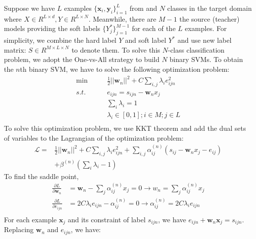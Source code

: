 Suppose we have $L$ examples $\{\textbf{x}_i,\textbf{y}_i\}_{i=1}^L$ from and $N$ classes in the target domain where $X\in R^{L\times d}, Y\in R^{L\times N}$. Meanwhile, there are $M-1$ the source (teacher) models providing the soft labels $\{Y^*_j\}_{j=1}^{M-1}$ for each of the $L$ examples.
For simplicity, we combine the hard label $Y$ and soft label $Y^*$ and use new label matrix: $S \in R^{M\times L \times N}$ to denote them. To solve this $N$-class classification problem, we adopt the One-vs-All strategy to build $N$ binary SVMs.
To obtain the $n$th binary SVM, we have to solve the following optimization problem: 
\begin{equation}\label{eq:multi-distill}
\begin{aligned}
\min \qquad & \frac{1}{2}{|| \textbf{w}_n ||^2} + C\sum_{i,j} \lambda_i{e_{ijn}^2} \\
s.t.\qquad& e_{ijn} = s_{ijn} - \textbf{w}_nx_j\\
& \sum_i\lambda_i=1\\
& \lambda_i \in [0,1]; i\in M;  j\in L\\
\end{aligned}  
\end{equation}
To solve this optimization problem, we use KKT theorem \cite{cristianini2000introduction} and add the dual sets of variables to the Lagrangian of the optimization problem:
\begin{equation}
\begin{aligned}
\mathcal{L}=&\frac{1}{2}{|| \textbf{w}_n ||^2} + C\sum_{i,j} \lambda_i{e_{ijn}^2}+\sum_{i,j}\alpha^{(n)}_{ij}\left(s_{ij} - \textbf{w}_nx_j-e_{ij}\right)\\&+\beta^{(n)}\left(\sum_i\lambda_i-1\right)
\end{aligned}
\end{equation}
To find the saddle point, 
\begin{equation}
\begin{aligned}
\frac{{\partial L}}{{\partial \textbf{w}_n}}& = \textbf{w}_n - \sum_{j}\alpha^{(n)}_{ij} {x_j}=0 \rightarrow w_n = \sum_{j}\alpha^{(n)}_{ij} {x_j}\\
\frac{{\partial L}}{{\partial {e_{ijn}}}} & = 2C\lambda_i {e_{ijn}} - {\alpha^{(n)} _{ij}}=0 \rightarrow \alpha^{(n)}_{ij} = 2C\lambda_i {e_{ijn}}\\
\end{aligned}
\end{equation}
For each example $\textbf{x}_j$ and its constraint of label $s_{ijn}$, we have $e_{ijn}  + \textbf{w}_n\textbf{x}_j= s_{ijn}$. Replacing $\textbf{w}_n$ and $e_{ijn}$,  we have:  
